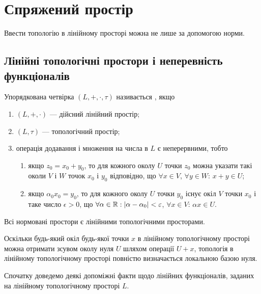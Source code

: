 \chapter{Спряжений простір}

Ввести топологію в лінійному просторі можна не лише за
допомогою норми.

\section{Лінійні топологічні простори і неперевність функціоналів}

\begin{definition}
Упорядкована четвірка $(L, +, \cdot, \tau)$ називається
, якщо
\begin{enumerate}
\item $(L, +, \cdot)$ --- дійсний лінійний простір;
\item $(L, \tau)$ --- топологічний простір;
\item операція додавання і множення на числа в $L$ є
неперервними, тобто
\begin{enumerate}
\item якщо $z_0 = x_0 + y_0$, то для кожного околу $U$ точки $z_0$
можна указати такі околи $V$ і $W$ точок $x_0$ і $y_0$ відповідно,
що $\forall x \in V$, $\forall y \in W$: $x + y \in U$;
\item якщо $\alpha_0 x_0 = y_0$, то для кожного околу $U$ точки $y_0$
існує окіл $V$ точки $x_0$ і таке число $\epsilon > 0$, що
$\forall \alpha \in \mathbb{R}: |\alpha - \alpha_0| < \varepsilon$, $\forall x \in V$: $\alpha x \in U$.
\end{enumerate}
\end{enumerate}
\end{definition}

\begin{example}
Всі нормовані простори є лінійними
топологічними просторами.
\end{example}

\begin{remark}
Оскільки будь-який окіл будь-якої точки
$x$ в лінійному топологічному просторі можна отримати
зсувом околу нуля $U$ шляхом операції $U + x$, топологія в
лінійному топологічному просторі повністю визначається
локальною базою нуля.
\end{remark}

Спочатку доведемо деякі допоміжні факти щодо лінійних
функціоналів, заданих на лінійному топологічному просторі
$L$.

